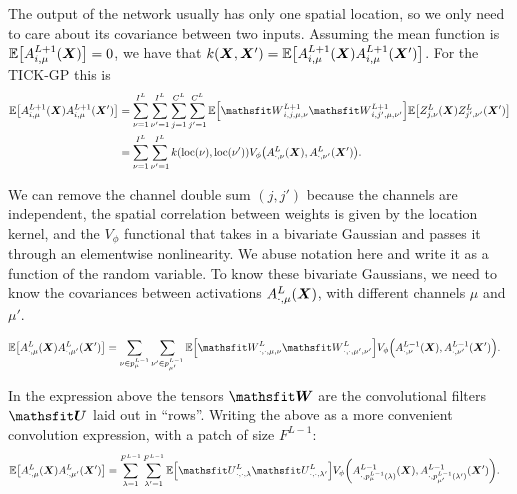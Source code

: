 \documentclass{article} %
\newcommand{\bracket}[3]{{\left#1 #3 \right#2}}
\newcommand{\bra}{\bracket{(}{)}}
\newcommand{\sqb}{\bracket{[}{]}}
\newcommand{\ssup}[1]{^{#1}}
\begin{document}
The output of the network usually has only one spatial location, so we only need to care about its covariance between two inputs. Assuming the mean function is $\E\sqb{\emA_{i,\mu}\ssup{L+1}(\mX)} = 0$, we have that $k(\mX, \mX') = \E\sqb{\emA_{i,\mu}\ssup{L+1}(\mX)\emA_{i,\mu}\ssup{L+1}(\mX')}$. For the TICK-GP this is
\begin{align}
\E\sqb{\emA_{i,\mu}\ssup{L+1}(\mX)\emA_{i,\mu}\ssup{L+1}(\mX')} &=
\sum_{\nu=1}^{I^L} \sum_{\nu'=1}^{I^L} \sum_{j=1}^{C^L} \sum_{j'=1}^{C^L} \E\sqb{\etW\ssup{L+1}_{i,j,\mu,\nu}\etW\ssup{L+1}_{i,j',\mu,\nu'}}
\E\sqb{\emZ\ssup{L}_{j,\nu}(\mX) \emZ\ssup{L}_{j',\nu'}(\mX')} \\
&= \sum_{\nu=1}^{I^L} \sum_{\nu'=1}^{I^L}k(\text{loc}(\nu), \text{loc}(\nu')) V_\phi\bra{\emA\ssup{L}_{\cdot,\nu}(\mX), \emA\ssup{L}_{\cdot,\nu'}(\mX')}.
\end{align}

We can remove the channel double sum $(j, j')$ because the channels are independent, the spatial correlation between weights is given by the location kernel, and the $V_\phi$ functional that takes in a bivariate Gaussian and passes it through an elementwise nonlinearity. We abuse notation here and write it as a function of the random variable. To know these bivariate Gaussians, we need to know the covariances between activations $\emA_{\cdot,\mu}\ssup{L}(\mX)$, with different channels $\mu$ and $\mu'$.

\begin{align}
\E\sqb{\emA_{\cdot,\mu}\ssup{L}(\mX)\emA_{\cdot,\mu'}\ssup{L}(\mX')} &=
\sum_{\nu \in p_\mu^{L-1}} \sum_{\nu'\in p_{\mu'}^{L-1}} \E\sqb{\etW\ssup{L}_{\cdot,\cdot,\mu,\nu}\etW\ssup{L}_{\cdot,\cdot,\mu',\nu'}} V_\phi\bra{\emA\ssup{L-1}_{\cdot,\nu}(\mX), \emA\ssup{L-1}_{\cdot,\nu'}(\mX')}.
\end{align}

In the expression above the tensors $\tW$ are the convolutional filters $\tU$ laid out in ``rows''. Writing the above as a more convenient convolution expression, with a patch of size $F^{L-1}$:
\begin{align}
\E\sqb{\emA_{\cdot,\mu}\ssup{L}(\mX)\emA_{\cdot,\mu'}\ssup{L}(\mX')} &=
\sum_{\lambda=1}^{F^{L-1}} \sum_{\lambda'=1}^{F^{L-1}}
\E\sqb{\etU\ssup{L}_{\cdot,\cdot,\lambda}\etU\ssup{L}_{\cdot,\cdot,\lambda'}}
V_\phi\bra{\emA\ssup{L-1}_{\cdot,p_{\mu}^{L-1}(\lambda)}(\mX), \emA\ssup{L-1}_{\cdot,p_{\mu'}^{L-1}(\lambda')}(\mX')}.
\label{eq:full-cov}
\end{align}
\end{document}
